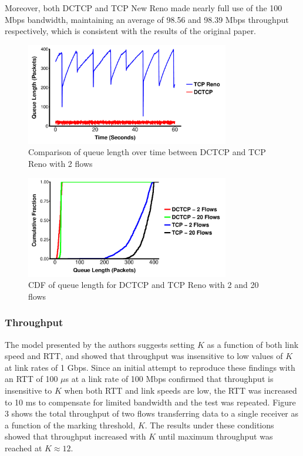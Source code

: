 Moreover, both DCTCP and TCP New Reno made nearly full use of the 100 Mbps bandwidth, maintaining an average of 98.56 and 98.39 Mbps throughput respectively, which is consistent with the results of the original paper. 

\begin{figure}
\includegraphics[height=1.75in,width=3.5in]{queue_2_flows}
\caption{Comparison of queue length over time between DCTCP and TCP Reno with 2 flows}
\end{figure}

\begin{figure}
\includegraphics[height=1.75in,width=3.5in]{queue_cdf}
\caption{CDF of queue length for DCTCP and TCP Reno with 2 and 20 flows}
\end{figure}

\subsubsection{Throughput}

The model presented by the authors suggests setting $K$ as a function of both link speed and RTT, and showed that throughput was insensitive to low values of $K$ at link rates of 1 Gbps. Since an initial attempt to reproduce these findings with an RTT of 100 $\mu$s at a link rate of 100 Mbps confirmed that throughput is insensitive to $K$ when both RTT and link speeds are low, the RTT was increased to 10 ms to compensate for limited bandwidth and the test was repeated. Figure 3 shows the total throughput of two flows transferring data to a single receiver as a function of the marking threshold, $K$. The results under these conditions showed that throughput increased with $K$ until maximum throughput was reached at $K \approx 12$.

